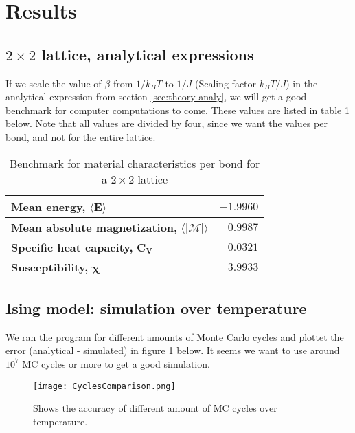 \documentclass[../main.tex]{subfiles}
\begin{document}
\section{Results}
\subsection{$2 \times 2$ lattice, analytical expressions}
If we scale the value of $\beta$ from $1/k_BT$ to $1/J$ (Scaling factor $k_B T/J$) in the analytical expression from section \ref{sec:theory-analy}, we will get a good benchmark for computer computations to come. These values are listed in table \ref{tab:2x2spinsEnergiesMags} below. Note that all values are divided by four, since we want the values per bond, and not for the entire lattice.
\begin{table}[!h]
\begin{center}
  \begin{tabular}{| l | r |}
    \hline
    \textbf{Mean energy,} $\mathbf{\langle E \rangle}$ & $-1.9960$  \\
    \hline
    \textbf{Mean absolute magnetization,} $\mathbf{\langle |\mathcal{M}| \rangle}$ & $0.9987$ \\
    \hline
    \textbf{Specific heat capacity,} $\mathbf{C_V}$ & $0.0321$\\
    \hline
    \textbf{Susceptibility,} $\mathbf \chi$ & $3.9933$ \\
    \hline
  \end{tabular}
  \caption{Benchmark for material characteristics per bond for a $2 \times 2$ lattice}
  \label{tab:2x2spinsEnergiesMags}
\end{center}
\end{table}
\FloatBarrier

\subsection{Ising model: simulation over temperature}
We ran the program for different amounts of Monte Carlo cycles and plottet the error (analytical - simulated) in figure \ref{fig:results-MCplot} below. It seems we want to use around $10^{7}$ MC cycles or more to get a good simulation.

\begin{figure}[!h]
\texttt{[image: CyclesComparison.png]}
\caption{Shows the accuracy of different amount of MC cycles over temperature.}
\label{fig:results-MCplot}
\end{figure}
\FloatBarrier
\end{document}
